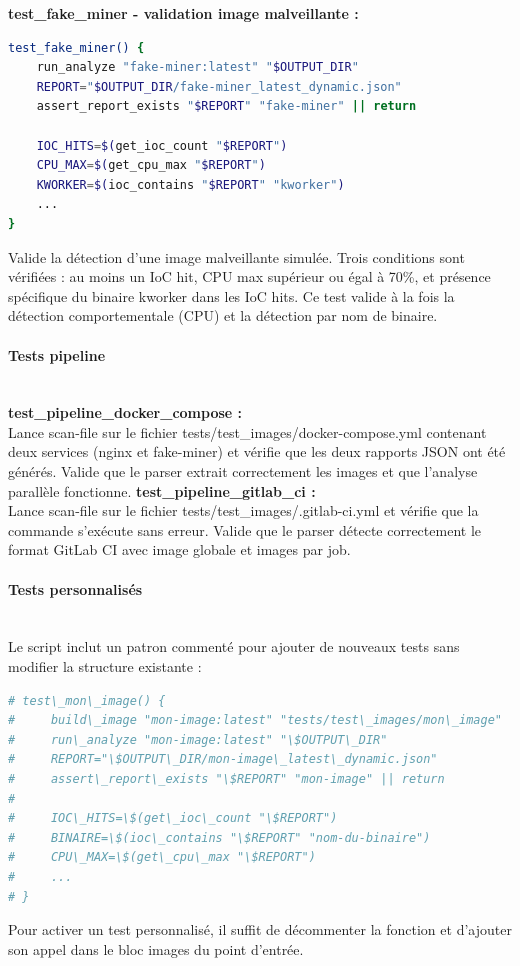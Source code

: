 \textbf{test\_fake\_miner - validation image malveillante :}  \\
\begin{lstlisting}[language=bash, caption=Test fake-miner]
test_fake_miner() {
    run_analyze "fake-miner:latest" "$OUTPUT_DIR"
    REPORT="$OUTPUT_DIR/fake-miner_latest_dynamic.json"
    assert_report_exists "$REPORT" "fake-miner" || return

    IOC_HITS=$(get_ioc_count "$REPORT")
    CPU_MAX=$(get_cpu_max "$REPORT")
    KWORKER=$(ioc_contains "$REPORT" "kworker")
    ...
}
\end{lstlisting}
Valide la détection d'une image malveillante simulée. Trois conditions sont vérifiées : au moins un IoC hit, CPU max supérieur ou égal à 70\%, et présence spécifique du binaire kworker dans les IoC hits. Ce test valide à la fois la détection comportementale (CPU) et la détection par nom de binaire.

\paragraph{Tests pipeline} \mbox{} \\
\textbf{test\_pipeline\_docker\_compose :}  \\
Lance scan-file sur le fichier tests/test\_images/docker-compose.yml contenant deux services (nginx et fake-miner) et vérifie que les deux rapports JSON ont été générés. Valide que le parser extrait correctement les images et que l'analyse parallèle fonctionne.
\textbf{test\_pipeline\_gitlab\_ci :}  \\
Lance scan-file sur le fichier tests/test\_images/.gitlab-ci.yml et vérifie que la commande s'exécute sans erreur. Valide que le parser détecte correctement le format GitLab CI avec image globale et images par job.

\paragraph{Tests personnalisés} \mbox{} \\
Le script inclut un patron commenté pour ajouter de nouveaux tests sans modifier la structure existante :
\begin{lstlisting}[language=bash, caption=Patron tests personnalisés]
# test\_mon\_image() {
#     build\_image "mon-image:latest" "tests/test\_images/mon\_image"
#     run\_analyze "mon-image:latest" "\$OUTPUT\_DIR"
#     REPORT="\$OUTPUT\_DIR/mon-image\_latest\_dynamic.json"
#     assert\_report\_exists "\$REPORT" "mon-image" || return
#
#     IOC\_HITS=\$(get\_ioc\_count "\$REPORT")
#     BINAIRE=\$(ioc\_contains "\$REPORT" "nom-du-binaire")
#     CPU\_MAX=\$(get\_cpu\_max "\$REPORT")
#     ...
# }
\end{lstlisting}
Pour activer un test personnalisé, il suffit de décommenter la fonction et d'ajouter son appel dans le bloc images du point d'entrée.

